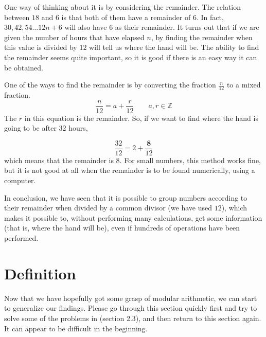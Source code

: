 One way of thinking about it is by considering the remainder. The relation between $18$ and $6$ is that both of them have a remainder of $6$. In fact, $30,42,54 \dots 12n+6$ will also have $6$ as their  remainder. It turns out that if we are given the number of hours that have elapsed $n$, by finding the remainder when this value is divided by $12$ will tell us where the hand will be. The ability to find the remainder seems quite important, so it is good if there is an easy way it can be obtained.

One of the ways to find the remainder is by converting the fraction $\frac{n}{12}$ to a mixed fraction.
\begin{equation}
\frac{n}{12} = a+\frac{r}{12} \qquad a,r \in\mathbb{Z}
\end{equation}
The $r$ in this equation is the remainder. So, if we want to find where the hand is going to be after $32$ hours,

\begin{equation}
\frac{32}{12} = 2+ \frac{\textbf{8}}{12}
\end{equation}
which means that the remainder is $8$.
For small numbers, this method works fine, but it is not good at all when the remainder is to be found numerically, using a computer.

In conclusion, we have seen that it is possible to group numbers according to their remainder when divided by a common divisor (we have used $12$), which makes it possible to, without performing many calculations, get some information (that is, where the hand will be), even if hundreds of operations have been performed.


\section{Definition}
Now that we have hopefully got some grasp of modular arithmetic, we can start to generalize our findings. Please go through this section quickly first and try to solve some of the problems in (section 2.3), and then return to this section again. It can appear to be difficult in the beginning.
